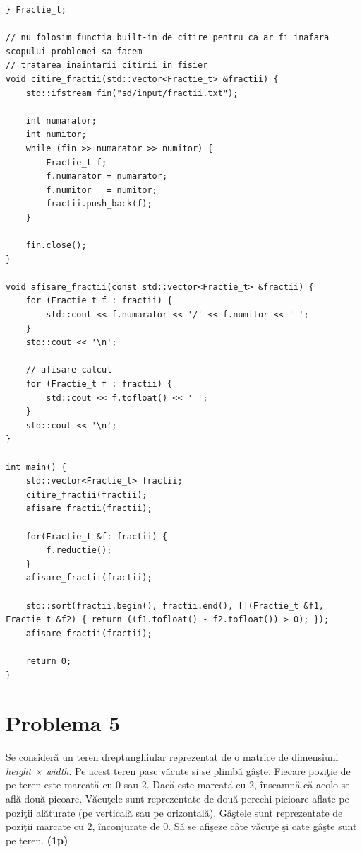 \documentclass[12pt]{book}
\begin{document}
\begin{lstlisting}
} Fractie_t;

// nu folosim functia built-in de citire pentru ca ar fi inafara scopului problemei sa facem
// tratarea inaintarii citirii in fisier
void citire_fractii(std::vector<Fractie_t> &fractii) {
    std::ifstream fin("sd/input/fractii.txt");

    int numarator;
    int numitor;
    while (fin >> numarator >> numitor) {
        Fractie_t f;
        f.numarator = numarator;
        f.numitor   = numitor;
        fractii.push_back(f);
    }

    fin.close();
}

void afisare_fractii(const std::vector<Fractie_t> &fractii) {
    for (Fractie_t f : fractii) {
        std::cout << f.numarator << '/' << f.numitor << ' ';
    }
    std::cout << '\n';

    // afisare calcul
    for (Fractie_t f : fractii) {
        std::cout << f.tofloat() << ' ';
    }
    std::cout << '\n';
}

int main() {
    std::vector<Fractie_t> fractii;
    citire_fractii(fractii);
    afisare_fractii(fractii);

    for(Fractie_t &f: fractii) {
        f.reductie();
    }
    afisare_fractii(fractii);

    std::sort(fractii.begin(), fractii.end(), [](Fractie_t &f1, Fractie_t &f2) { return ((f1.tofloat() - f2.tofloat()) > 0); });
    afisare_fractii(fractii);

    return 0;
}
\end{lstlisting}

\newpage

\section*{Problema 5}
Se consideră un teren dreptunghiular reprezentat de o matrice de dimensiuni \textit{height × width}. Pe acest teren pasc văcute si se plimbă gâşte. Fiecare poziţie de pe teren este marcată cu 0 sau 2. Dacă este marcată cu 2, înseamnă că acolo se află două picoare. Văcuţele sunt reprezentate de două perechi picioare aflate pe poziţii alăturate (pe verticală sau pe orizontală). Gâştele sunt reprezentate de poziţii marcate cu 2, înconjurate de 0. Să se afişeze câte văcuţe şi cate gâşte sunt pe teren. \textbf{(1p)} \newline
\end{document}
